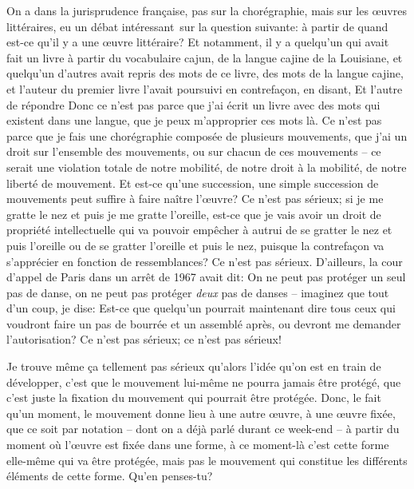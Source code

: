 {On a dans la jurisprudence fran\c{c}aise, pas sur la chor\'egraphie,
mais sur les {\oe}uvres litt\'eraires, eu un d\'ebat int\'eressant~sur
la question suivante: \`a partir de quand est{}-ce qu'il y a une
{\oe}uvre litt\'eraire? Et notamment, il y a quelqu'un qui avait fait
un livre \`a partir du vocabulaire cajun, de la langue cajine de la
Louisiane, et quelqu'un d'autres avait repris des mots de ce livre, des
mots de la langue cajine, et l'auteur du premier livre l'avait
poursuivi en contrefa\c{c}on, en disant,  Et l'autre de r\'epondre  Donc ce n'est pas parce que j'ai
\'ecrit un livre avec des mots qui existent dans une langue, que je
peux m'approprier ces mots l\`a. Ce n'est pas parce que je fais une
chor\'egraphie compos\'ee de plusieurs mouvements, que j'ai un droit
sur l'ensemble des mouvements, ou sur chacun de ces mouvements {--} ce
serait une violation totale de notre mobilit\'e, de notre droit \`a la
mobilit\'e, de notre libert\'e de mouvement. Et est{}-ce qu'une
succession, une simple succession de mouvements peut suffire \`a faire
na\^itre l'{\oe}uvre? Ce n'est pas s\'erieux; si je me gratte le nez et
puis je me gratte l'oreille, est{}-ce que je vais avoir un droit de
propri\'et\'e intellectuelle qui va pouvoir emp\^echer \`a autrui de se
gratter le nez et puis l'oreille ou de se gratter l'oreille et puis le
nez, puisque la contrefa\c{c}on va s'appr\'ecier en fonction de
ressemblances? Ce n'est pas s\'erieux. D'ailleurs, la cour d'appel de
Paris dans un arr\^et de 1967 avait dit:  On
ne peut pas prot\'eger un seul pas de danse, on ne peut pas prot\'eger
{\em deux} pas de danses {--} imaginez que tout d'un coup, je dise:
 Est{}-ce que quelqu'un
pourrait maintenant dire tous ceux qui voudront faire un pas de bourr\'ee et un assembl\'e apr\`es, ou
devront me demander l'autorisation? Ce n'est pas s\'erieux; ce n'est
pas s\'erieux!\par

Je trouve m\^eme \c{c}a tellement pas s\'erieux qu'alors l'id\'ee
qu'on est en train de d\'evelopper, c'est que le mouvement lui{}-m\^eme
ne pourra jamais \^etre prot\'eg\'e, que c'est juste la fixation du
mouvement qui pourrait \^etre prot\'eg\'ee. Donc, le fait qu'un moment,
le mouvement donne lieu \`a une autre {\oe}uvre, \`a une {\oe}uvre
fix\'ee, que ce soit par notation {--} dont on a d\'ej\`a parl\'e
durant ce week{}-end {--} \`a partir du moment o\`u l'{\oe}uvre est
fix\'ee dans une forme, \`a ce moment{}-l\`a c'est cette forme
elle{}-m\^eme qui va \^etre prot\'eg\'ee, mais pas le mouvement qui
constitue les diff\'erents \'el\'ements de cette forme. Qu'en
penses{}-tu?\par

}
